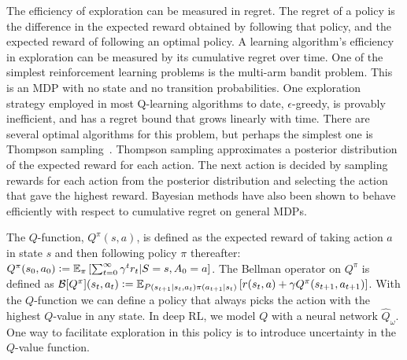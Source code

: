 \documentclass[]{uai2022} %
\newcommand{\defeq}{\vcentcolon=}
\newcommand{\E}{\mathbb{E}}
\newcommand{\B}{\mathcal{B}}
\begin{document}
The efficiency of exploration can be measured in regret.
The regret of a policy is the difference in the expected reward obtained by
following that policy, and the expected reward of following an optimal policy.
A learning algorithm's efficiency in exploration can be measured by its
cumulative regret over time. One of the simplest reinforcement learning 
problems is the multi-arm bandit problem. This is an MDP with no state and no
transition probabilities. One exploration strategy employed in most Q-learning
algorithms to date, \(\epsilon\)-greedy, is provably inefficient, and has a
regret bound that grows linearly with time. There are several optimal algorithms
for this problem, but perhaps the simplest one is Thompson sampling~\citep{thompson_likelihood_1933}.
Thompson sampling approximates a posterior distribution of the expected reward
for each action. The next action is decided by sampling rewards for each action
from the posterior distribution and selecting the action that gave the highest
reward. Bayesian methods have also been shown to behave efficiently with respect
to cumulative regret \citep{osband_generalization_2016} on general MDPs.


The \(Q\)-function, \(Q^\pi(s,a)\), is defined as the expected reward of taking action
\(a\) in state \(s\) and then following policy \(\pi\) thereafter:
\(Q^\pi(s_0, a_0) \defeq \E_\pi \left[ \sum_{t=0}^\infty \gamma^t r_t \vert S=s, A_0=a \right]\).
The Bellman operator on \(Q^\pi\) is defined as
\(\B[Q^\pi](s_t,a_t) \defeq \E_{P(s_{t+1} \vert s_t, a_t)\pi(a_{t+1} \vert s_t)}
\left[ r(s_t, a) + \gamma Q^\pi(s_{t+1}, a_{t+1}) \right]\). With the
\(Q\)-function we can define a policy that always picks the action with the 
highest \(Q\)-value in any state. In deep RL, we model \(Q\) with a
neural network \(\hat{Q}_\omega\). One way to facilitate exploration in this
policy is to introduce uncertainty in the
\(Q\)-value function.
\end{document}
